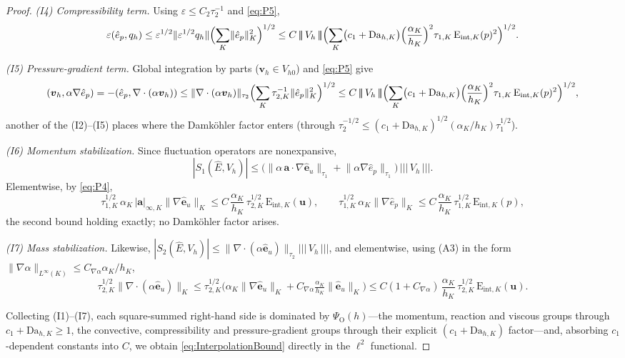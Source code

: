 \documentclass[11pt]{article}
\theoremstyle{remark}
\newcommand{\bu}{\boldsymbol{u}}
\newcommand{\bv}{\boldsymbol{v}}
\newcommand{\ba}{\boldsymbol{a}}
\newcommand{\norm}[1]{\lVert #1 \rVert}
\newcommand{\tnorm}[1]{\lvert\!\lvert\!\lvert\, #1 \,\rvert\!\rvert\!\rvert}
\newcommand{\Eint}[2]{\mathrm{E}_{\mathrm{int},#1}(#2)}
\newcommand{\Dah}{\mathrm{Da}_{h,K}}
\begin{document}
\begin{proof}
\smallskip\noindent
\emph{(I4) Compressibility term.} Using $\varepsilon \le C_2\tau_2^{-1}$ and
\cref{eq:P5},
\[
  \varepsilon(\hat e_p, q_h)
  \le \varepsilon^{1/2}\norm{\varepsilon^{1/2}q_h}
  \Bigl( \sum_K \norm{\hat e_p}_K^2 \Bigr)^{1/2}
  \le C\,\tnorm{V_h}\Bigl( \sum_K \bigl(c_1+\Dah\bigr)
  \Bigl(\frac{\alpha_K}{h_K}\Bigr)^2\tau_{1,K}\,\Eint{K}{p}^2 \Bigr)^{1/2}.
\]

\smallskip\noindent
\emph{(I5) Pressure-gradient term.} Global integration by parts
($\bv_h \in V_{h0}$) and \cref{eq:P5} give
\[
  (\bv_h, \alpha\nabla\hat e_p)
  = -(\hat e_p, \nabla\cdot(\alpha\bv_h))
  \le \norm{\nabla\cdot(\alpha\bv_h)}_{\tau_2}
  \Bigl( \sum_K \tau_{2,K}^{-1}\norm{\hat e_p}_K^2 \Bigr)^{1/2}
  \le C\,\tnorm{V_h}\Bigl( \sum_K \bigl(c_1+\Dah\bigr)
  \Bigl(\frac{\alpha_K}{h_K}\Bigr)^2\tau_{1,K}\,\Eint{K}{p}^2 \Bigr)^{1/2},
\]
another of the (I2)--(I5) places where the Damk\"ohler factor enters (through
$\tau_2^{-1/2} \le (c_1+\Dah)^{1/2}(\alpha_K/h_K)\tau_1^{1/2}$).

\smallskip\noindent
\emph{(I6) Momentum stabilization.} Since fluctuation operators are nonexpansive,
\[
  |S_1(\hat E, V_h)|
  \le \bigl( \norm{\alpha\,\ba\cdot\nabla\hat{\boldsymbol e}_u}_{\tau_1}
  + \norm{\alpha\nabla\hat e_p}_{\tau_1} \bigr)\,\tnorm{V_h}.
\]
Elementwise, by \cref{eq:P4},
\[
  \tau_{1,K}^{1/2}\,\alpha_K\,|\ba|_{\infty,K}\norm{\nabla\hat{\boldsymbol e}_u}_K
  \le C\,\frac{\alpha_K}{h_K}\,\tau_{2,K}^{1/2}\,\Eint{K}{\bu},
  \qquad
  \tau_{1,K}^{1/2}\,\alpha_K\norm{\nabla\hat e_p}_K
  \le C\,\frac{\alpha_K}{h_K}\,\tau_{1,K}^{1/2}\,\Eint{K}{p},
\]
the second bound holding exactly; no Damk\"ohler factor arises.

\smallskip\noindent
\emph{(I7) Mass stabilization.} Likewise,
$|S_2(\hat E, V_h)| \le
\norm{\nabla\cdot(\alpha\hat{\boldsymbol e}_u)}_{\tau_2}\tnorm{V_h}$, and elementwise,
using (A3) in the form $\norm{\nabla\alpha}_{L^\infty(K)} \le C_{\nabla\alpha}\alpha_K/h_K$,
\[
  \tau_{2,K}^{1/2}\norm{\nabla\cdot(\alpha\hat{\boldsymbol e}_u)}_K
  \le \tau_{2,K}^{1/2}\bigl( \alpha_K \norm{\nabla\hat{\boldsymbol e}_u}_K
  + C_{\nabla\alpha}\tfrac{\alpha_K}{h_K}\norm{\hat{\boldsymbol e}_u}_K \bigr)
  \le C(1+C_{\nabla\alpha})\,\frac{\alpha_K}{h_K}\,\tau_{2,K}^{1/2}\,\Eint{K}{\bu}.
\]

Collecting (I1)--(I7), each square-summed right-hand side is dominated by
$\Psi_{\mathrm O}(h)$---the momentum, reaction and viscous groups through
$c_1+\Dah \ge 1$, the convective, compressibility and pressure-gradient groups through their explicit
$(c_1+\Dah)$ factor---and, absorbing $c_1$-dependent constants into $C$, we obtain
\cref{eq:InterpolationBound} directly in the $\ell^2$ functional.
\end{proof}
\end{document}
